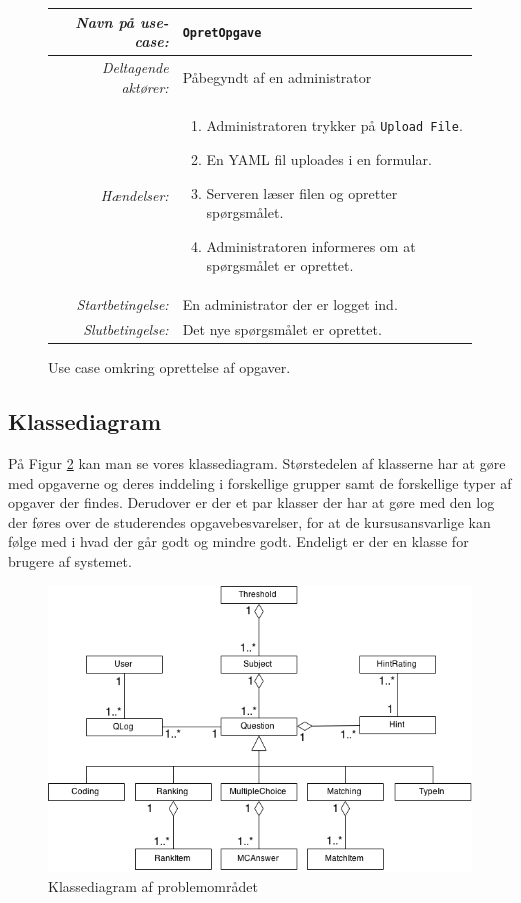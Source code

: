 \documentclass[11pt, a4paper]{article}
\begin{document}
\begin{figure}[h]
    \centering
    \begin{tabular}{r p{8cm}}
        \toprule
        \textit{Navn på use-case:} & \verb!OpretOpgave! \\
        \hline
        \textit{Deltagende aktører:} & Påbegyndt af en administrator \\
        \hline
        \textit{Hændelser:} & \begin{enumerate}[nolistsep]
            \item Administratoren trykker på \verb!Upload File!.
            \item En YAML fil uploades i en formular.
            \item Serveren læser filen og opretter spørgsmålet.
            \item Administratoren informeres om at spørgsmålet er oprettet.
        \end{enumerate}  \\
        \hline
        \textit{Startbetingelse:} & En administrator der er logget ind. \\
        \hline
        \textit{Slutbetingelse:} & Det nye spørgsmålet er oprettet. \\
        \bottomrule
    \end{tabular}
    \caption{Use case omkring oprettelse af opgaver.}
    \label{fig:use_case3}
\end{figure}
\FloatBarrier

\subsection{Klassediagram}
På Figur \ref{fig:class_diagram} kan man se vores klassediagram. Størstedelen af klasserne har at gøre med opgaverne og deres inddeling i forskellige grupper samt de forskellige typer af opgaver der findes. Derudover er der et par klasser der har at gøre med den log der føres over de studerendes opgavebesvarelser, for at de kursusansvarlige kan følge med i hvad der går godt og mindre godt. Endeligt er der en klasse for brugere af systemet.

\begin{figure}[h]
    \centering
    \includegraphics[width=1\linewidth]{figures/ClassDiagram.png}
    \caption{Klassediagram af problemområdet}
    \label{fig:class_diagram}
\end{figure}
\FloatBarrier
\end{document}
